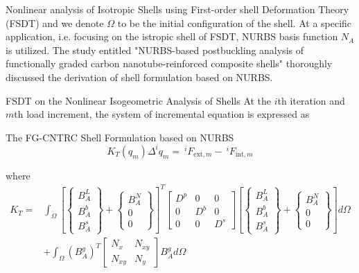 \documentclass[
10pt,
aspectratio=169,
]{beamer}
\begin{document}
\begin{frame}{Nonlinear analysis of Isotropic Shells using First-order shell Deformation Theory (FSDT)}
    and we denote \(\Omega\) to be the initial configuration of the shell. At a specific application, i.e. focusing on the istropic shell of FSDT, NURBS basis function \(N_A\) is utilized. The study entitled "NURBS-based postbuckling analysis of functionally graded carbon nanotube-reinforced composite shells" thoroughly discussed the derivation of shell formulation based on NURBS.
\end{frame}
\begin{frame}[c]{FSDT on the Nonlinear Isogeometric Analysis of Shells}
    At the \(i\)th iteration and \(m\)th load increment, the system of incremental equation is expressed as
    \begin{block}{The FG-CNTRC Shell Formulation based on NURBS}
        $$K_T(q_m)\Delta^iq_m =\:^iF_{\text{ext},m} -\: ^iF_{\text{int},m}$$
    \end{block} \pause
    where 
    \begin{align*}
        K_T = &\int_{\Omega}\left[
        \left\{
        \begin{matrix}
            B_A^L \\ B_A^b \\ B_A^s
        \end{matrix}
        \right\}
        +
        \left\{
        \begin{matrix}
            B_A^N \\ 0 \\ 0
        \end{matrix}
        \right\}
        \right]^T
        \begin{bmatrix}
            D^p & 0 & 0 \\
            0 & D^b & 0 \\
            0 & 0 & D^s
        \end{bmatrix}
        \left[
        \left\{
        \begin{matrix}
            B_A^L \\ B_A^b \\ B_A^s
        \end{matrix}
        \right\}
        +
        \left\{
        \begin{matrix}
            B_A^N \\ 0 \\ 0
        \end{matrix}
        \right\}
        \right]d\Omega
        \\ &+\int_{\Omega} \left(B^g_A\right)^T
    \begin{bmatrix}
        N_x & N_{xy} \\[2pt]
        N_{xy} & N_y
    \end{bmatrix}B^g_Ad\Omega
    \end{align*}  
\end{frame}
\end{document}
